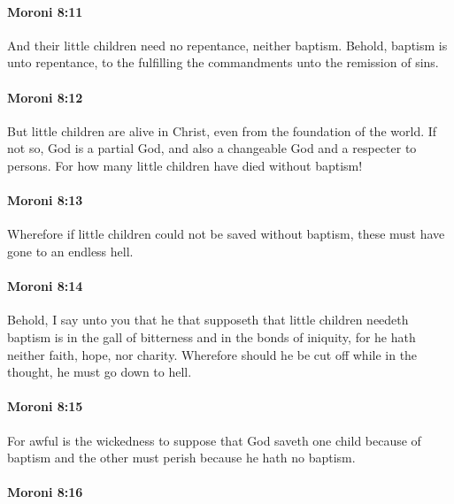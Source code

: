 		\paragraph{Moroni 8:11} %
			\label{MORONI-8-11}

			And their little children need no repentance, neither baptism.
			Behold, baptism is unto repentance,
			to the fulfilling the commandments unto the remission of sins.

		\paragraph{Moroni 8:12} %
			\label{MORONI-8-12}

			But little children are alive in Christ,
			even from the foundation of the world.
			If not so, God is a partial God,
			and also a changeable God and a respecter to persons.
			For how many little children have died without baptism!

		\paragraph{Moroni 8:13} %
			\label{MORONI-8-13}

			Wherefore if little children could not be saved without baptism,
			these must have gone to an endless hell.

		\paragraph{Moroni 8:14} %
			\label{MORONI-8-14}

			Behold, I say unto you
			that he that supposeth that little children needeth baptism
			is in the gall of bitterness and in the bonds of iniquity,
			for he hath neither faith, hope, nor charity.
			Wherefore should he be cut off while in the thought,
			he must go down to hell.

		\paragraph{Moroni 8:15} %
			\label{MORONI-8-15}

			For awful is the wickedness to suppose
			that God saveth one child because of baptism
			and the other must perish because he hath no baptism.

		\paragraph{Moroni 8:16} %
			\label{MORONI-8-16}

